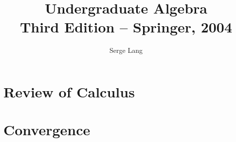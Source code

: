 \documentclass[english, 11pt, a4paper]{book}
\begin{document}
\DeclareRobustCommand{\rchi}{{\mathpalette\irchi\relax}}
\newcommand{\irchi}[2]{\raisebox{\depth}{$#1\chi$}} %

\makeatletter
\newcommand{\mybox}{%
    \collectbox{%
        \setlength{\fboxsep}{1pt}%
        \fbox{\BOXCONTENT}%
    }%
}
\makeatother

\author{Serge Lang}
\title{Undergraduate Algebra\\
\small{Third Edition -- Springer, 2004}}
\maketitle

\frontmatter%

%

%	
\setcounter{tocdepth}{1}	%
\tableofcontents

\mainmatter%

\part{Review of Calculus}						%


\part{Convergence}	         					%

\end{document}

